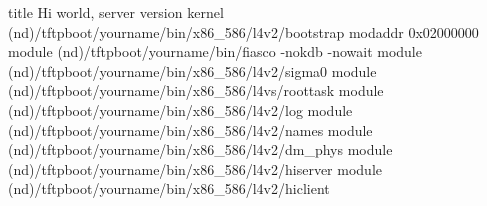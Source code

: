 title Hi world, server version
  kernel (nd)/tftpboot/yourname/bin/x86_586/l4v2/bootstrap
  modaddr 0x02000000
  module (nd)/tftpboot/yourname/bin/fiasco -nokdb -nowait
  module (nd)/tftpboot/yourname/bin/x86_586/l4v2/sigma0
  module (nd)/tftpboot/yourname/bin/x86_586/l4vs/roottask
  module (nd)/tftpboot/yourname/bin/x86_586/l4v2/log
  module (nd)/tftpboot/yourname/bin/x86_586/l4v2/names
  module (nd)/tftpboot/yourname/bin/x86_586/l4v2/dm_phys
  module (nd)/tftpboot/yourname/bin/x86_586/l4v2/hiserver 
  module (nd)/tftpboot/yourname/bin/x86_586/l4v2/hiclient
